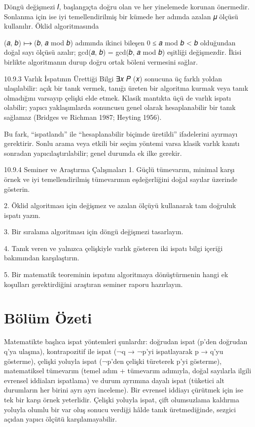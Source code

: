Döngü değişmezi 𝐼, başlangıçta doğru olan ve her yinelemede korunan önermedir. Sonlanma için ise iyi temellendirilmiş bir kümede her adımda azalan 𝜇 ölçüsü kullanılır. Öklid algoritmasında

(𝑎, 𝑏) ⟼ (𝑏, 𝑎 mod 𝑏) adımında ikinci bileşen 0 ≤ 𝑎 mod 𝑏 < 𝑏 olduğundan doğal sayı ölçüsü azalır; gcd(𝑎, 𝑏) = gcd(𝑏, 𝑎 mod 𝑏) eşitliği değişmezdir. İkisi birlikte algoritmanın durup doğru ortak böleni vermesini sağlar.

10.9.3 Varlık İspatının Ürettiği Bilgi ∃𝑥 𝑃 (𝑥) sonucuna üç farklı yoldan ulaşılabilir: açık bir tanık vermek, tanığı üreten bir algoritma kurmak veya tanık olmadığını varsayıp çelişki elde etmek. Klasik mantıkta üçü de varlık ispatı olabilir; yapıcı yaklaşımlarda sonuncusu genel olarak hesaplanabilir bir tanık sağlamaz (Bridges ve Richman 1987; Heyting 1956).

Bu fark, “ispatlandı” ile “hesaplanabilir biçimde üretildi” ifadelerini ayırmayı gerektirir. Sonlu arama veya etkili bir seçim yöntemi varsa klasik varlık kanıtı sonradan yapıcılaştırılabilir; genel durumda ek ilke gerekir.

10.9.4 Seminer ve Araştırma Çalışmaları 1. Güçlü tümevarım, minimal karşı örnek ve iyi temellendirilmiş tümevarımın eşdeğerliğini doğal sayılar üzerinde gösterin.

2. Öklid algoritması için değişmez ve azalan ölçüyü kullanarak tam doğruluk ispatı yazın.

3. Bir sıralama algoritması için döngü değişmezi tasarlayın.

4. Tanık veren ve yalnızca çelişkiyle varlık gösteren iki ispatı bilgi içeriği bakımından karşılaştırın.

5. Bir matematik teoreminin ispatını algoritmaya dönüştürmenin hangi ek koşulları gerektirdiğini araştıran seminer raporu hazırlayın.

\section*{Bölüm Özeti}

Matematikte başlıca ispat yöntemleri şunlardır: doğrudan ispat (p’den doğrudan q’ya ulaşma), kontrapozitif ile ispat (¬q → ¬p’yi ispatlayarak p → q’yu gösterme), çelişki yoluyla ispat (¬p’den çelişki türeterek p’yi gösterme), matematiksel tümevarım (temel adım + tümevarım adımıyla, doğal sayılarla ilgili evrensel iddiaları ispatlama) ve durum ayrımına dayalı ispat (tüketici alt durumların her birini ayrı ayrı inceleme). Bir evrensel iddiayı çürütmek için ise tek bir karşı örnek yeterlidir. Çelişki yoluyla ispat, çift olumsuzlama kaldırma yoluyla olumlu bir var oluş sonucu verdiği hâlde tanık üretmediğinde, sezgici açıdan yapıcı ölçütü karşılamayabilir.

